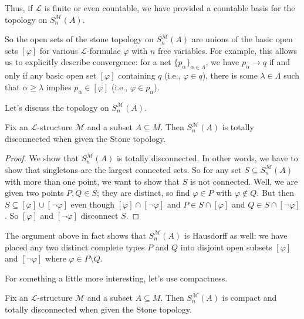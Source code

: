 \documentclass[../notes.tex]{subfiles}
\begin{document}
\begin{remark}
	Thus, if $\mathcal L$ is finite or even countable, we have provided a countable basis for the topology on $S_n^{\mathcal M}(A)$.
\end{remark}
So the open sets of the stone topology on $S_n^{\mathcal M}(A)$ are unions of the basic open sets $[\varphi]$ for various $\mathcal L$-formulae $\varphi$ with $n$ free variables. For example, this allows us to explicitly describe convergence: for a net $\{p_\alpha\}_{\alpha\in\Lambda}$, we have $p_\alpha\to q$ if and only if any basic open set $[\varphi]$ containing $q$ (i.e., $\varphi\in q$), there is some $\lambda\in\Lambda$ such that $\alpha\ge\lambda$ implies $p_\alpha\in[\varphi]$ (i.e., $\varphi\in p_\alpha$).

Let's discuss the topology on $S_n^{\mathcal M}(A)$.
\begin{proposition} \label{prop:stone-tot-disc}
	Fix an $\mathcal L$-structure $\mathcal M$ and a subset $A\subseteq M$. Then $S_n^{\mathcal M}(A)$ is totally disconnected when given the Stone topology.
\end{proposition}
\begin{proof}
	We show that $S_n^{\mathcal M}(A)$ is totally disconnected. In other words, we have to show that singletons are the largest connected sets. So for any set $S\subseteq S_n^{\mathcal M}(A)$ with more than one point, we want to show that $S$ is not connected. Well, we are given two points $P,Q\in S$; they are distinct, so find $\varphi\in P$ with $\varphi\notin Q$. But then $S\subseteq[\varphi]\cup[\lnot\varphi]$ even though $[\varphi]\cap[\lnot\varphi]$ and $P\in S\cap[\varphi]$ and $Q\in S\cap[\lnot\varphi]$. So $[\varphi]$ and $[\lnot\varphi]$ disconnect $S$.
\end{proof}
\begin{remark}
	The argument above in fact shows that $S_n^{\mathcal M}(A)$ is Hausdorff as well: we have placed any two distinct complete types $P$ and $Q$ into disjoint open subsets $[\varphi]$ and $[\lnot\varphi]$ where $\varphi\in P\setminus Q$.
\end{remark}
For something a little more interesting, let's use compactness.
\begin{theorem} \label{thm:stone-compact}
	Fix an $\mathcal L$-structure $\mathcal M$ and a subset $A\subseteq M$. Then $S_n^{\mathcal M}(A)$ is compact and totally disconnected when given the Stone topology.
\end{theorem}
\end{document}
